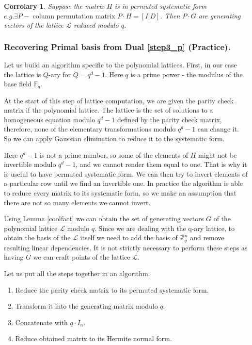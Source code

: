 \documentclass[12pt]{article}
\newcommand{\FF}{\mathbb{F}}
\newcommand{\ZZ}{\mathbb{Z}}
\newcommand{\LL}{\mathcal{L}}
\newtheorem{corrolary}{Corrolary}
\begin{document}
\begin{corrolary}
Suppose the matrix $H$ is in permuted systematic form $e.g. \exists P - \text{ column permutation matrix } P \cdot H = [I | D]$. Then $P \cdot G$ are generating vectors of the lattice $\LL$ reduced modulo $q$.
\end{corrolary}
\subsubsection{Recovering Primal basis from Dual \ref{step3_p} (Practice).}
\label{subsubsec:primal_from_dual_pr_polynomials}

Let us build an algorithm specific to the polynomial lattices. First, in our case the lattice is $Q$-ary for $Q = q^{d} -1$. Here $q$ is a prime power - the modulus of the base field $\FF_{q}$.

At the start of this step of lattice computation, we are given the parity check matrix if the polynomial lattice. The lattice is the set of solutions to a homogeneous equation modulo $q^{d} -1$ defined by the parity check matrix, therefore, none of the elementary transformations modulo $q^{d} -1$ can change it. So we can apply Gaussian elimination to reduce it to the systematic form.

Here $q^{d} -1$ is not a prime number, so some of the elements of $H$ might not be invertible modulo $q^{d} -1$, and we cannot render them equal to one. That is why it is useful to have permuted systematic form. We can then try to invert elements of a particular row until we find an invertible one. In practice the algorithm is able to reduce every matrix to its systematic form, so we make an assumption that there are not so many elements we cannot invert.

Using Lemma \ref{coolfact} we can obtain the set of generating vectors $G$ of the polynomial lattice $\LL$ modulo $q$. Since we are dealing with the q-ary lattice, to obtain the basis of the $\LL$ itself we need to add the basis of $\ZZ^{n}_{q}$ and remove resulting linear dependencies. It is not strictly necessary to perform these steps as having $G$ we can craft points of the lattice $\LL$.

Let us put all the steps together in an algorithm:
\begin{enumerate}
    \item Reduce the parity check matrix to its permuted systematic form.
    \item Transform it into the generating matrix modulo $q$.
    \item Concatenate with $q \cdot I_{n}$.
    \item Reduce obtained matrix to its Hermite normal form.
\end{enumerate}
\end{document}
